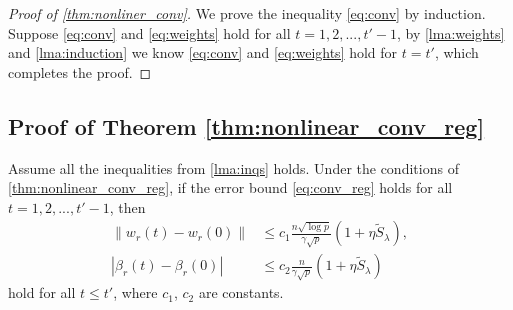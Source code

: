 \begin{proof}[Proof of \cref{thm:nonliner_conv}]
We prove the inequality \eqref{eq:conv} by induction. Suppose \eqref{eq:conv} and \eqref{eq:weights} hold for all $t=1,2,...,t'-1$, by \cref{lma:weights} and \cref{lma:induction} we know \eqref{eq:conv} and \eqref{eq:weights} hold for $t=t'$, which completes the proof.
\end{proof}

\subsection{Proof of Theorem \ref{thm:nonlinear_conv_reg}}

\begin{lemma}
\label{lma:weights_reg}
Assume all the inequalities from \cref{lma:inqs} holds. Under the conditions of \cref{thm:nonlinear_conv_reg}, if the error bound \eqref{eq:conv_reg} holds for all $t=1,2,...,t'-1$, then 
\begin{equation}
\label{eq:weights_reg}
\begin{aligned}
    \|w_r(t)-w_r(0)\| &\leq c_1\frac{n\sqrt{\log p}}{\gamma\sqrt p}(1+\eta \tilde{S}_\lambda),\\
    |\beta_r(t)-\beta_r(0)| &\leq c_2\frac{n}{\gamma\sqrt p}(1+\eta \tilde{S}_\lambda)
\end{aligned}
\end{equation}
hold for all $t\leq t'$, where $c_1$, $c_2$ are constants.
\end{lemma}

